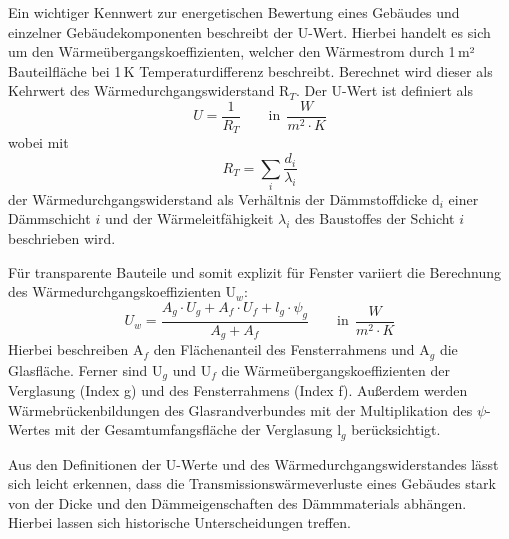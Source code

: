 Ein wichtiger Kennwert zur energetischen Bewertung eines Gebäudes und einzelner Gebäudekomponenten beschreibt der U-Wert.
Hierbei handelt es sich um den Wärmeübergangskoeffizienten, welcher den Wärmestrom durch 1\,m² Bauteilfläche bei 1\,K Temperaturdifferenz beschreibt. 
Berechnet wird dieser als Kehrwert des Wärmedurchgangswiderstand R\(_T\). 
Der U-Wert ist definiert als
\begin{equation}
\label{eq:Gleichung221}
U = \frac{1}{R_T}  \qquad \text{in} \ \ \frac{W}{m^2 \cdot K} 
\end{equation}
wobei mit
\begin{equation}
\label{eq:Gleichung222}
R_T = \sum \limits_{i} \frac{d_i}{\lambda_i}	
\end{equation}				%
der Wärmedurchgangswiderstand als Verhältnis der Dämmstoffdicke d\(_i\) einer Dämmschicht \(i\) und der Wärmeleitfähigkeit \(\lambda_i\) des Baustoffes der Schicht \(i\) beschrieben wird. 

Für transparente Bauteile und somit explizit für Fenster variiert die Berechnung des Wärmedurchgangskoeffizienten U\(_w\):
\begin{equation}
\label{eq:Gleichung223}
U_w = \frac{A_g \cdot U_g + A_f \cdot U_f + l_g \cdot \psi_g}{A_g + A_f}  \qquad \text{in} \ \ \frac{W}{m^2 \cdot K}
\end{equation}
Hierbei beschreiben A\(_f\) den Flächenanteil des Fensterrahmens und A\(_g\) die Glasfläche. Ferner sind U\(_g\) und U\(_f\) die Wärmeübergangskoeffizienten der Verglasung (Index g) und des Fensterrahmens (Index f). 
Außerdem werden Wärmebrückenbildungen des Glasrandverbundes mit der Multiplikation des \(\psi\)-Wertes mit der Gesamtumfangsfläche der Verglasung l\(_g\) berücksichtigt. \cite{Laasch.2013}

Aus den Definitionen der U-Werte und des Wärmedurchgangswiderstandes lässt sich leicht erkennen, dass die Transmissionswärmeverluste eines Gebäudes stark von der Dicke und den Dämmeigenschaften des Dämmmaterials abhängen. 
Hierbei lassen sich historische Unterscheidungen treffen.


